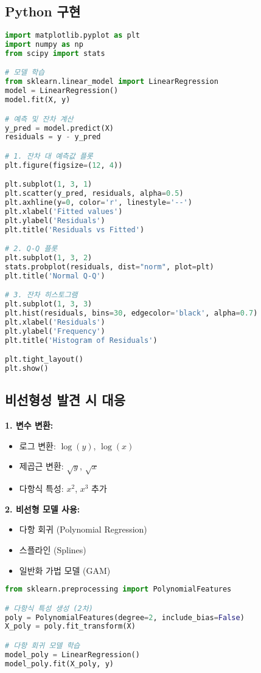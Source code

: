 \documentclass[12pt]{article}
\begin{document}
\subsection{Python 구현}

\begin{lstlisting}[language=Python]
import matplotlib.pyplot as plt
import numpy as np
from scipy import stats

# 모델 학습
from sklearn.linear_model import LinearRegression
model = LinearRegression()
model.fit(X, y)

# 예측 및 잔차 계산
y_pred = model.predict(X)
residuals = y - y_pred

# 1. 잔차 대 예측값 플롯
plt.figure(figsize=(12, 4))

plt.subplot(1, 3, 1)
plt.scatter(y_pred, residuals, alpha=0.5)
plt.axhline(y=0, color='r', linestyle='--')
plt.xlabel('Fitted values')
plt.ylabel('Residuals')
plt.title('Residuals vs Fitted')

# 2. Q-Q 플롯
plt.subplot(1, 3, 2)
stats.probplot(residuals, dist="norm", plot=plt)
plt.title('Normal Q-Q')

# 3. 잔차 히스토그램
plt.subplot(1, 3, 3)
plt.hist(residuals, bins=30, edgecolor='black', alpha=0.7)
plt.xlabel('Residuals')
plt.ylabel('Frequency')
plt.title('Histogram of Residuals')

plt.tight_layout()
plt.show()
\end{lstlisting}

\subsection{비선형성 발견 시 대응}

\textbf{1. 변수 변환:}
\begin{itemize}
    \item 로그 변환: $\log(y)$, $\log(x)$
    \item 제곱근 변환: $\sqrt{y}$, $\sqrt{x}$
    \item 다항식 특성: $x^2$, $x^3$ 추가
\end{itemize}

\textbf{2. 비선형 모델 사용:}
\begin{itemize}
    \item 다항 회귀 (Polynomial Regression)
    \item 스플라인 (Splines)
    \item 일반화 가법 모델 (GAM)
\end{itemize}

\begin{lstlisting}[language=Python]
from sklearn.preprocessing import PolynomialFeatures

# 다항식 특성 생성 (2차)
poly = PolynomialFeatures(degree=2, include_bias=False)
X_poly = poly.fit_transform(X)

# 다항 회귀 모델 학습
model_poly = LinearRegression()
model_poly.fit(X_poly, y)
\end{lstlisting}
\end{document}
